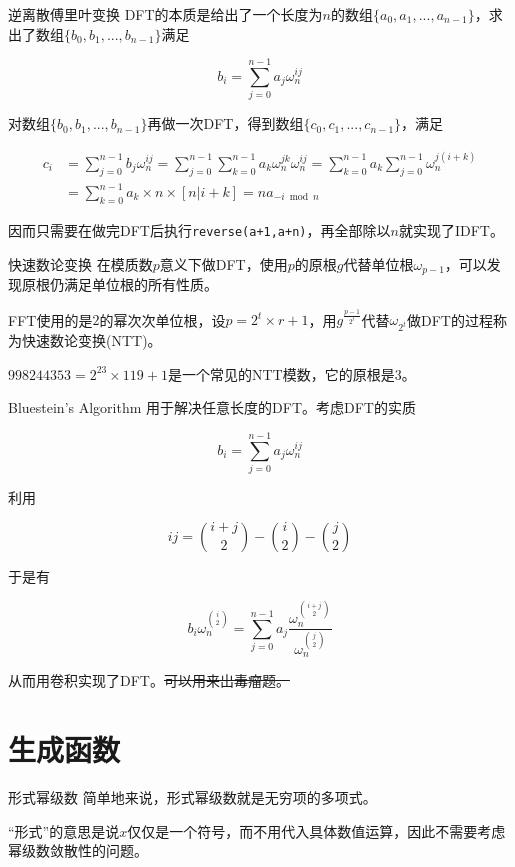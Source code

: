 \documentclass{beamer}
\begin{document}
	\begin{frame}{逆离散傅里叶变换}
		DFT的本质是给出了一个长度为$n$的数组$\{a_0,a_1,...,a_{n-1}\}$，求出了数组$\{b_0,b_1,...,b_{n-1}\}$满足
		
		$$b_i=\sum_{j=0}^{n-1}a_j\omega_n^{ij}$$
		
		对数组$\{b_0,b_1,...,b_{n-1}\}$再做一次DFT，得到数组$\{c_0,c_1,...,c_{n-1}\}$，满足
		
		\begin{align*}
			c_i&=\sum_{j=0}^{n-1}b_j\omega_n^{ij}=\sum_{j=0}^{n-1}\sum_{k=0}^{n-1}a_k\omega_n^{jk}\omega_n^{ij}=\sum_{k=0}^{n-1}a_k\sum_{j=0}^{n-1}\omega_n^{j(i+k)}\\&=\sum_{k=0}^{n-1}a_k\times n\times [n|i+k]=na_{-i \bmod n}
		\end{align*}
		
		因而只需要在做完DFT后执行\texttt{reverse(a+1,a+n)}，再全部除以$n$就实现了IDFT。
	\end{frame}
	\begin{frame}{快速数论变换}
		在模质数$p$意义下做DFT，使用$p$的原根$g$代替单位根$\omega_{p-1}$，可以发现原根仍满足单位根的所有性质。
		
		FFT使用的是$2$的幂次次单位根，设$p = 2^t \times r + 1$，用$g^{\frac{p-1}{2^t}}$代替$\omega_{2^t}$做DFT的过程称为快速数论变换(NTT)。
		
		$998244353=2^{23}\times 119 +1$是一个常见的NTT模数，它的原根是$3$。
	\end{frame}
	\begin{frame}{Bluestein's Algorithm}
		用于解决任意长度的DFT。考虑DFT的实质
		
		$$b_i=\sum_{j=0}^{n-1}a_j\omega_n^{ij}$$
		
		利用
		
		$$ij=\binom{i+j}{2}-\binom{i}{2}-\binom{j}{2}$$
		
		于是有
		
		$$b_i\omega_n^{\binom{i}{2}}=\sum_{j=0}^{n-1}a_j\frac{\omega_n^{\binom{i+j}{2}}}{\omega_n^{\binom{j}{2}}}$$
		
		从而用卷积实现了DFT。\sout{可以用来出毒瘤题。}
	\end{frame}
	\section{生成函数}
	\begin{frame}{形式幂级数}
		简单地来说，形式幂级数就是无穷项的多项式。
		
		“形式”的意思是说$x$仅仅是一个符号，而不用代入具体数值运算，因此不需要考虑幂级数敛散性的问题。
	\end{frame}
\end{document}
